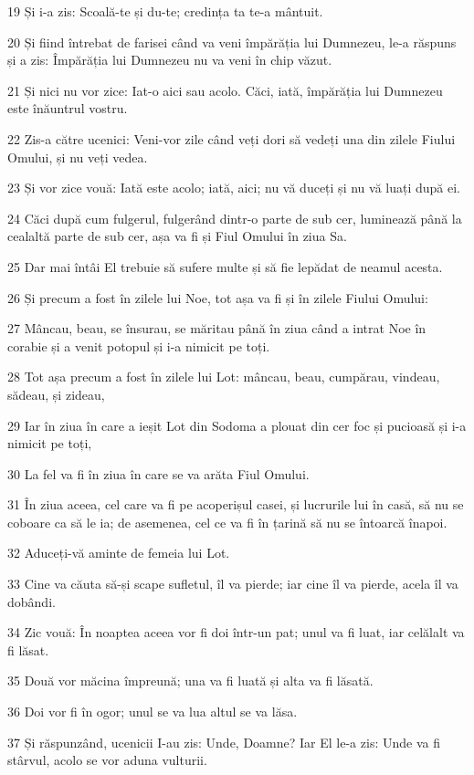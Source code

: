 \par 19 Și i-a zis: Scoală-te și du-te; credința ta te-a mântuit.
\par 20 Și fiind întrebat de farisei când va veni împărăția lui Dumnezeu, le-a răspuns și a zis: Împărăția lui Dumnezeu nu va veni în chip văzut.
\par 21 Și nici nu vor zice: Iat-o aici sau acolo. Căci, iată, împărăția lui Dumnezeu este înăuntrul vostru.
\par 22 Zis-a către ucenici: Veni-vor zile când veți dori să vedeți una din zilele Fiului Omului, și nu veți vedea.
\par 23 Și vor zice vouă: Iată este acolo; iată, aici; nu vă duceți și nu vă luați după ei.
\par 24 Căci după cum fulgerul, fulgerând dintr-o parte de sub cer, luminează până la cealaltă parte de sub cer, așa va fi și Fiul Omului în ziua Sa.
\par 25 Dar mai întâi El trebuie să sufere multe și să fie lepădat de neamul acesta.
\par 26 Și precum a fost în zilele lui Noe, tot așa va fi și în zilele Fiului Omului:
\par 27 Mâncau, beau, se însurau, se măritau până în ziua când a intrat Noe în corabie și a venit potopul și i-a nimicit pe toți.
\par 28 Tot așa precum a fost în zilele lui Lot: mâncau, beau, cumpărau, vindeau, sădeau, și zideau,
\par 29 Iar în ziua în care a ieșit Lot din Sodoma a plouat din cer foc și pucioasă și i-a nimicit pe toți,
\par 30 La fel va fi în ziua în care se va arăta Fiul Omului.
\par 31 În ziua aceea, cel care va fi pe acoperișul casei, și lucrurile lui în casă, să nu se coboare ca să le ia; de asemenea, cel ce va fi în țarină să nu se întoarcă înapoi.
\par 32 Aduceți-vă aminte de femeia lui Lot.
\par 33 Cine va căuta să-și scape sufletul, îl va pierde; iar cine îl va pierde, acela îl va dobândi.
\par 34 Zic vouă: În noaptea aceea vor fi doi într-un pat; unul va fi luat, iar celălalt va fi lăsat.
\par 35 Două vor măcina împreună; una va fi luată și alta va fi lăsată.
\par 36 Doi vor fi în ogor; unul se va lua altul se va lăsa.
\par 37 Și răspunzând, ucenicii I-au zis: Unde, Doamne? Iar El le-a zis: Unde va fi stârvul, acolo se vor aduna vulturii.

